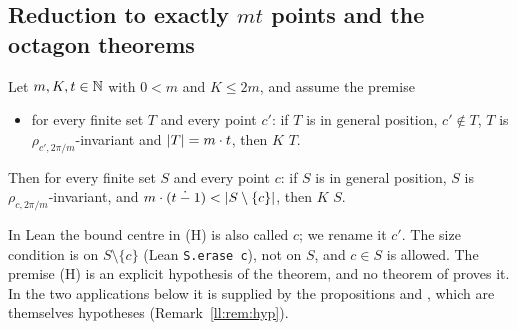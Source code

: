 \subsection{Reduction to exactly \texorpdfstring{$mt$}{mt} points and the octagon theorems}

\begin{theorem}\label{ll:thm:reduction}
Let $m,K,t\in\mathbb N$ with $0<m$ and $K\le 2m$, and assume the premise
\begin{itemize}
\item[(H)] for every finite set $T$ and every point $c'$: if $T$ is in general position, $c'\notin T$, $T$ is
  $\rho_{c',2\pi/m}$-invariant and $\lvert T\rvert=m\cdot t$, then  $K$ $T$.
\end{itemize}
Then for every finite set $S$ and every point $c$: if $S$ is in general position, $S$ is $\rho_{c,2\pi/m}$-invariant,
and $m\cdot(t\mathbin{\dot{-}}1)<\lvert S\setminus\{c\}\rvert$, then  $K$ $S$.
\end{theorem}

In Lean the bound centre in (H) is also called $c$; we rename it $c'$. The size condition is on $S\setminus\{c\}$
(Lean \texttt{S.erase c}), not on $S$, and $c\in S$ is allowed. The premise (H) is an explicit hypothesis of the
theorem, and no theorem of  proves it. In the two applications below it is supplied by
the propositions  and , which are themselves hypotheses (Remark~\ref{ll:rem:hyp}).

